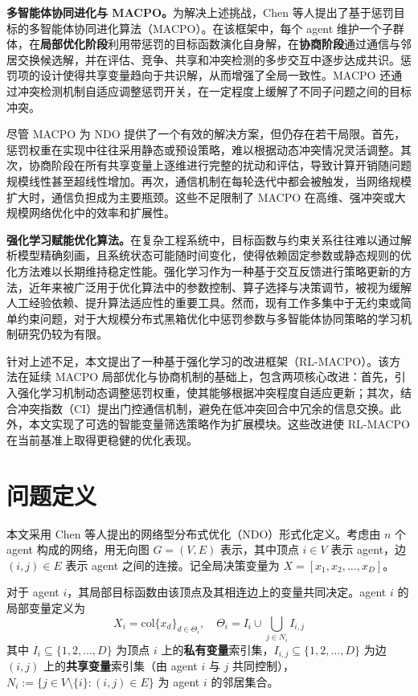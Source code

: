 \documentclass[conference]{IEEEtran}
\begin{document}
\textbf{多智能体协同进化与 MACPO。}为解决上述挑战，Chen
等人提出了基于惩罚目标的多智能体协同进化算法（MACPO）。在该框架中，每个
agent
维护一个子群体，在\textbf{局部优化阶段}利用带惩罚的目标函数演化自身解，在\textbf{协商阶段}通过通信与邻居交换候选解，并在评估、竞争、共享和冲突检测的多步交互中逐步达成共识。惩罚项的设计使得共享变量趋向于共识解，从而增强了全局一致性。MACPO
还通过冲突检测机制自适应调整惩罚开关，在一定程度上缓解了不同子问题之间的目标冲突。

尽管 MACPO 为 NDO
提供了一个有效的解决方案，但仍存在若干局限。首先，惩罚权重在实现中往往采用静态或预设策略，难以根据动态冲突情况灵活调整。其次，协商阶段在所有共享变量上逐维进行完整的扰动和评估，导致计算开销随问题规模线性甚至超线性增加。再次，通信机制在每轮迭代中都会被触发，当网络规模扩大时，通信负担成为主要瓶颈。这些不足限制了
MACPO 在高维、强冲突或大规模网络优化中的效率和扩展性。

\textbf{强化学习赋能优化算法。}在复杂工程系统中，目标函数与约束关系往往难以通过解析模型精确刻画，且系统状态可能随时间变化，使得依赖固定参数或静态规则的优化方法难以长期维持稳定性能。强化学习作为一种基于交互反馈进行策略更新的方法，近年来被广泛用于优化算法中的参数控制、算子选择与决策调节，被视为缓解人工经验依赖、提升算法适应性的重要工具。然而，现有工作多集中于无约束或简单约束问题，对于大规模分布式黑箱优化中惩罚参数与多智能体协同策略的学习机制研究仍较为有限。

针对上述不足，本文提出了一种基于强化学习的改进框架（RL-MACPO）。该方法在延续
MACPO
局部优化与协商机制的基础上，包含两项核心改进：首先，引入强化学习机制动态调整惩罚权重，使其能够根据冲突程度自适应更新；其次，结合冲突指数（CI）提出门控通信机制，避免在低冲突回合中冗余的信息交换。此外，本文实现了可选的智能变量筛选策略作为扩展模块。这些改进使 RL-MACPO 在当前基准上取得更稳健的优化表现。


\section{问题定义}\label{ux95eeux9898ux5b9aux4e49}

本文采用 Chen 等人提出的网络型分布式优化（NDO）形式化定义。考虑由 \(n\) 个 agent 构成的网络，用无向图 \(G = (V, E)\) 表示，其中顶点 \(i \in V\) 表示 agent，边 \((i, j) \in E\) 表示 agent 之间的连接。记全局决策变量为 \(X = [x_1, x_2, \ldots, x_D]\)。

对于 agent \(i\)，其局部目标函数由该顶点及其相连边上的变量共同决定。agent \(i\) 的局部变量定义为
\[
X_i = \mathrm{col}\{x_d\}_{d \in \Theta_i}, \quad \Theta_i = I_i \cup \bigcup_{j \in N_i} I_{i,j}
\]
其中 \(I_i \subseteq \{1, 2, \ldots, D\}\) 为顶点 \(i\) 上的\textbf{私有变量}索引集，\(I_{i,j} \subseteq \{1, 2, \ldots, D\}\) 为边 \((i,j)\) 上的\textbf{共享变量}索引集（由 agent \(i\) 与 \(j\) 共同控制），\(N_i := \{j \in V \setminus \{i\} : (i,j) \in E\}\) 为 agent \(i\) 的邻居集合。
\end{document}
